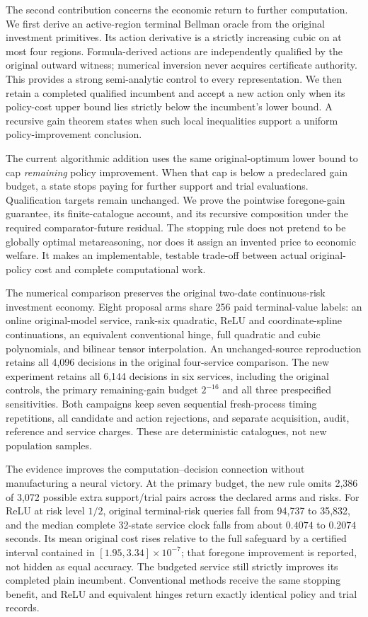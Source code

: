 The second contribution concerns the economic return to further computation. We first derive an active-region terminal Bellman oracle from the original investment primitives. Its action derivative is a strictly increasing cubic on at most four regions. Formula-derived actions are independently qualified by the original outward witness; numerical inversion never acquires certificate authority. This provides a strong semi-analytic control to every representation. We then retain a completed qualified incumbent and accept a new action only when its policy-cost upper bound lies strictly below the incumbent's lower bound. A recursive gain theorem states when such local inequalities support a uniform policy-improvement conclusion.

The current algorithmic addition uses the same original-optimum lower bound to cap \emph{remaining} policy improvement. When that cap is below a predeclared gain budget, a state stops paying for further support and trial evaluations. Qualification targets remain unchanged. We prove the pointwise foregone-gain guarantee, its finite-catalogue account, and its recursive composition under the required comparator-future residual. The stopping rule does not pretend to be globally optimal metareasoning, nor does it assign an invented price to economic welfare. It makes an implementable, testable trade-off between actual original-policy cost and complete computational work.

The numerical comparison preserves the original two-date continuous-risk investment economy. Eight proposal arms share 256 paid terminal-value labels: an online original-model service, rank-six quadratic, ReLU and coordinate-spline continuations, an equivalent conventional hinge, full quadratic and cubic polynomials, and bilinear tensor interpolation. An unchanged-source reproduction retains all 4,096 decisions in the original four-service comparison. The new experiment retains all 6,144 decisions in six services, including the original controls, the primary remaining-gain budget $2^{-16}$ and all three prespecified sensitivities. Both campaigns keep seven sequential fresh-process timing repetitions, all candidate and action rejections, and separate acquisition, audit, reference and service charges. These are deterministic catalogues, not new population samples.

The evidence improves the computation--decision connection without manufacturing a neural victory. At the primary budget, the new rule omits 2,386 of 3,072 possible extra support/trial pairs across the declared arms and risks. For ReLU at risk level $1/2$, original terminal-risk queries fall from 94,737 to 35,832, and the median complete 32-state service clock falls from about $0.4074$ to $0.2074$ seconds. Its mean original cost rises relative to the full safeguard by a certified interval contained in $[1.95,3.34]\times10^{-7}$; that foregone improvement is reported, not hidden as equal accuracy. The budgeted service still strictly improves its completed plain incumbent. Conventional methods receive the same stopping benefit, and ReLU and equivalent hinges return exactly identical policy and trial records.

